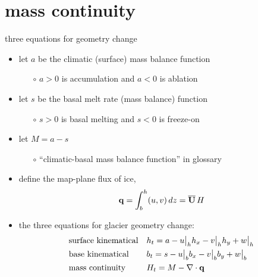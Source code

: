 
\section{mass continuity}


\begin{frame}{three equations for geometry change}

\begin{itemize}
\item let $a$ be the climatic (surface) mass balance function
    \begin{itemize}
    \item[$\circ$] $a>0$ is accumulation and $a<0$ is ablation
    \end{itemize}
\item let $s$ be the basal melt rate (mass balance) function
    \begin{itemize}
    \item[$\circ$] $s>0$ is basal melting and $s<0$ is freeze-on
    \end{itemize}
\item let $M=a-s$
    \begin{itemize}
    \item[$\circ$] ``climatic-basal mass balance function'' in glossary
    \end{itemize}
\item define the map-plane flux of ice,
	$$\mathbf{q} = \int_{b}^{h} (u,v)\,dz = \overline{\mathbf{U}}\,H$$
\item the three equations for glacier geometry change:
\begin{align*}
&\text{surface kinematical} && h_t = a - u\big|_h h_x - v\big|_h h_y + w\big|_h  \\
&\text{base kinematical} && b_t = s - u\big|_b b_x - v\big|_b b_y + w\big|_b  \\
&\text{mass continuity} && H_t = M - \nabla\cdot \mathbf{q}
\end{align*}
\end{itemize}
\end{frame}



